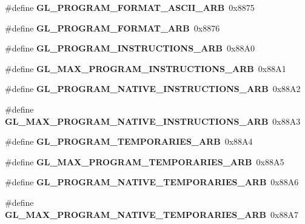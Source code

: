 \begin{DoxyCompactItemize}
\item 
\#define {\bfseries G\+L\+\_\+\+P\+R\+O\+G\+R\+A\+M\+\_\+\+F\+O\+R\+M\+A\+T\+\_\+\+A\+S\+C\+I\+I\+\_\+\+A\+R\+B}~0x8875\label{_s_d_l__opengl_8h_a3548a6b472d63d5ee6647ae466990832}

\item 
\#define {\bfseries G\+L\+\_\+\+P\+R\+O\+G\+R\+A\+M\+\_\+\+F\+O\+R\+M\+A\+T\+\_\+\+A\+R\+B}~0x8876\label{_s_d_l__opengl_8h_abea9256878c64639634d8154cb956761}

\item 
\#define {\bfseries G\+L\+\_\+\+P\+R\+O\+G\+R\+A\+M\+\_\+\+I\+N\+S\+T\+R\+U\+C\+T\+I\+O\+N\+S\+\_\+\+A\+R\+B}~0x88\+A0\label{_s_d_l__opengl_8h_ab90f0275619b91635ecb72af642b11de}

\item 
\#define {\bfseries G\+L\+\_\+\+M\+A\+X\+\_\+\+P\+R\+O\+G\+R\+A\+M\+\_\+\+I\+N\+S\+T\+R\+U\+C\+T\+I\+O\+N\+S\+\_\+\+A\+R\+B}~0x88\+A1\label{_s_d_l__opengl_8h_ab0ff0e5866976191429bf1e3d5d95c9e}

\item 
\#define {\bfseries G\+L\+\_\+\+P\+R\+O\+G\+R\+A\+M\+\_\+\+N\+A\+T\+I\+V\+E\+\_\+\+I\+N\+S\+T\+R\+U\+C\+T\+I\+O\+N\+S\+\_\+\+A\+R\+B}~0x88\+A2\label{_s_d_l__opengl_8h_a4b0080664dee33231e1d4d2779fc817b}

\item 
\#define {\bfseries G\+L\+\_\+\+M\+A\+X\+\_\+\+P\+R\+O\+G\+R\+A\+M\+\_\+\+N\+A\+T\+I\+V\+E\+\_\+\+I\+N\+S\+T\+R\+U\+C\+T\+I\+O\+N\+S\+\_\+\+A\+R\+B}~0x88\+A3\label{_s_d_l__opengl_8h_a10979fc8d90b84bfcd8c1b25378992c5}

\item 
\#define {\bfseries G\+L\+\_\+\+P\+R\+O\+G\+R\+A\+M\+\_\+\+T\+E\+M\+P\+O\+R\+A\+R\+I\+E\+S\+\_\+\+A\+R\+B}~0x88\+A4\label{_s_d_l__opengl_8h_a5e669fd8030346042293a62a770e0bd2}

\item 
\#define {\bfseries G\+L\+\_\+\+M\+A\+X\+\_\+\+P\+R\+O\+G\+R\+A\+M\+\_\+\+T\+E\+M\+P\+O\+R\+A\+R\+I\+E\+S\+\_\+\+A\+R\+B}~0x88\+A5\label{_s_d_l__opengl_8h_a2b82d98a4930003284478c725924fa73}

\item 
\#define {\bfseries G\+L\+\_\+\+P\+R\+O\+G\+R\+A\+M\+\_\+\+N\+A\+T\+I\+V\+E\+\_\+\+T\+E\+M\+P\+O\+R\+A\+R\+I\+E\+S\+\_\+\+A\+R\+B}~0x88\+A6\label{_s_d_l__opengl_8h_ac3078c1fbbfc034e4ac4a3a5d92277b6}

\item 
\#define {\bfseries G\+L\+\_\+\+M\+A\+X\+\_\+\+P\+R\+O\+G\+R\+A\+M\+\_\+\+N\+A\+T\+I\+V\+E\+\_\+\+T\+E\+M\+P\+O\+R\+A\+R\+I\+E\+S\+\_\+\+A\+R\+B}~0x88\+A7\label{_s_d_l__opengl_8h_a47a6f625a2473ab8725cdce296e1352d}


\end{DoxyCompactItemize}
